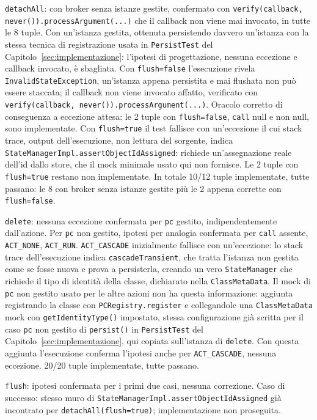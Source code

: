\texttt{detachAll}: con broker senza istanze gestite, confermato con \texttt{verify(callback,
never()).processArgument(...)} che il callback non viene mai invocato, in tutte le 8 tuple. Con
un'istanza gestita, ottenuta persistendo davvero un'istanza con la stessa tecnica di registrazione
usata in \texttt{PersistTest} del Capitolo~\ref{sec:implementazione}: l'ipotesi di progettazione,
nessuna eccezione e callback invocato, è sbagliata. Con \texttt{flush=false} l'esecuzione rivela
\texttt{InvalidStateException}, un'istanza appena persistita e mai flushata non può essere
staccata; il callback non viene invocato affatto, verificato con \texttt{verify(callback,
never()).processArgument(...)}. Oracolo corretto di conseguenza a eccezione attesa: le 2 tuple con
\texttt{flush=false}, \texttt{call} null e non null, sono implementate. Con \texttt{flush=true}
il test fallisce con un'eccezione il cui stack trace, output dell'esecuzione, non lettura del
sorgente, indica \texttt{StateManagerImpl.assertObjectIdAssigned}: richiede un'assegnazione reale
dell'id dallo store, che il mock minimale usato qui non fornisce. Le 2 tuple con \texttt{flush=true}
restano non implementate. In totale 10/12 tuple implementate, tutte passano: le 8 con broker senza
istanze gestite più le 2 appena corrette con \texttt{flush=false}.

\texttt{delete}: nessuna eccezione confermata per \texttt{pc} gestito, indipendentemente
dall'azione. Per \texttt{pc} non gestito, ipotesi per analogia confermata per \texttt{call}
assente, \texttt{ACT\_NONE}, \texttt{ACT\_RUN}. \texttt{ACT\_CASCADE} inizialmente fallisce con
un'eccezione: lo stack trace dell'esecuzione indica \texttt{cascadeTransient}, che tratta l'istanza
non gestita come se fosse nuova e prova a persisterla, creando un vero \texttt{StateManager} che
richiede il tipo di identità della classe, dichiarato nella \texttt{ClassMetaData}. Il mock di
\texttt{pc} non gestito usato per le altre azioni non ha questa informazione: aggiunta registrando
la classe con \texttt{PCRegistry.register} e collegandole una \texttt{ClassMetaData} mock con
\texttt{getIdentityType()} impostato, stessa configurazione già scritta per il caso \texttt{pc} non
gestito di \texttt{persist()} in \texttt{PersistTest} del Capitolo~\ref{sec:implementazione}, qui
copiata sull'istanza di \texttt{delete}. Con questa aggiunta l'esecuzione conferma l'ipotesi anche
per \texttt{ACT\_CASCADE}, nessuna eccezione. 20/20 tuple implementate, tutte passano.

\texttt{flush}: ipotesi confermata per i primi due casi, nessuna correzione. Caso di successo:
stesso muro di \texttt{StateManagerImpl.assertObjectIdAssigned} già incontrato per
\texttt{detachAll(flush=true)}; implementazione non proseguita.

